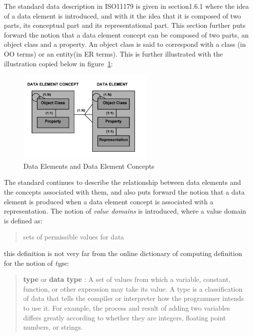 \documentclass{llncs}
\begin{document}
The standard data description in ISO11179 is given in section1.6.1 where the idea of a data element is introduced, and with it the idea that it is composed of two parts, its conceptual part and its representational part. This section further puts forward the notion that a data element concept can be composed of two parts, an object class and a property. An object class is said to correspond with a class (in OO terms) or an entity(in ER terms). This is further illustrated with the illustration copied below in figure~\ref{fig:DEC}:

\begin{figure}[h]
\includegraphics[width=0.6\textwidth,natwidth=610,natheight=642]{DataElementConcept}
\caption{Data Elements and Data Element Concepts} 
\label{fig:DEC}
\end{figure}

The standard continues to describe the relationship between data elements and the concepts associated with them, and also puts forward the notion that a data element is produced when a data element concept is associated with a representation. The notion of \emph{value domains} is introduced, where a value domain is defined as:

\begin{quotation} {sets of permissible values for data} \end{quotation}

  this definition is not very far from the online dictionary of computing definition for the notion of \emph{type}: 
\begin{quotation}
\textbf{type} or \textbf{data type} : A set of values from which a variable, constant, function, or other expression may take its value. A type is a classification of data that tells the compiler or interpreter how the programmer intends to use it. For example, the process and result of adding two variables differs greatly according to whether they are integers, floating point numbers, or strings. 
\end{quotation}
\end{document}
